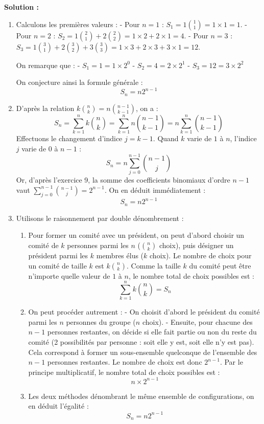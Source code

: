 \textbf{Solution :}
\begin{enumerate}
    \item Calculons les premières valeurs :
    - Pour $n=1$ : $S_1 = 1 \binom{1}{1} = 1 \times 1 = 1$.
    - Pour $n=2$ : $S_2 = 1 \binom{2}{1} + 2 \binom{2}{2} = 1 \times 2 + 2 \times 1 = 4$.
    - Pour $n=3$ : $S_3 = 1 \binom{3}{1} + 2 \binom{3}{2} + 3 \binom{3}{3} = 1 \times 3 + 2 \times 3 + 3 \times 1 = 12$.
    
    On remarque que :
    - $S_1 = 1 = 1 \times 2^0$
    - $S_2 = 4 = 2 \times 2^1$
    - $S_3 = 12 = 3 \times 2^2$
    
    On conjecture ainsi la formule générale :
    \[
    S_n = n 2^{n-1}
    \]
    
    \item D'après la relation $k \binom{n}{k} = n \binom{n-1}{k-1}$, on a :
    \[
    S_n = \sum_{k=1}^n k \binom{n}{k} = \sum_{k=1}^n n \binom{n-1}{k-1} = n \sum_{k=1}^n \binom{n-1}{k-1}
    \]
    Effectuons le changement d'indice $j = k-1$. Quand $k$ varie de $1$ à $n$, l'indice $j$ varie de $0$ à $n-1$ :
    \[
    S_n = n \sum_{j=0}^{n-1} \binom{n-1}{j}
    \]
    Or, d'après l'exercice 9, la somme des coefficients binomiaux d'ordre $n-1$ vaut $\sum_{j=0}^{n-1} \binom{n-1}{j} = 2^{n-1}$.
    On en déduit immédiatement :
    \[
    S_n = n 2^{n-1}
    \]
    
    \item Utilisons le raisonnement par double dénombrement :
    \begin{enumerate}
        \item Pour former un comité avec un président, on peut d'abord choisir un comité de $k$ personnes parmi les $n$ ($\binom{n}{k}$ choix), puis désigner un président parmi les $k$ membres élus ($k$ choix). Le nombre de choix pour un comité de taille $k$ est $k\binom{n}{k}$.
        Comme la taille $k$ du comité peut être n'importe quelle valeur de $1$ à $n$, le nombre total de choix possibles est :
        \[
        \sum_{k=1}^n k \binom{n}{k} = S_n
        \]
        
        \item On peut procéder autrement :
        - On choisit d'abord le président du comité parmi les $n$ personnes du groupe ($n$ choix).
        - Ensuite, pour chacune des $n-1$ personnes restantes, on décide si elle fait partie ou non du reste du comité (2 possibilités par personne : soit elle y est, soit elle n'y est pas). Cela correspond à former un sous-ensemble quelconque de l'ensemble des $n-1$ personnes restantes. Le nombre de choix est donc $2^{n-1}$.
        Par le principe multiplicatif, le nombre total de choix possibles est :
        \[
        n \times 2^{n-1}
        \]
        
        \item Les deux méthodes dénombrant le même ensemble de configurations, on en déduit l'égalité :
        \[
        S_n = n 2^{n-1}
        \]
    \end{enumerate}
\end{enumerate}

